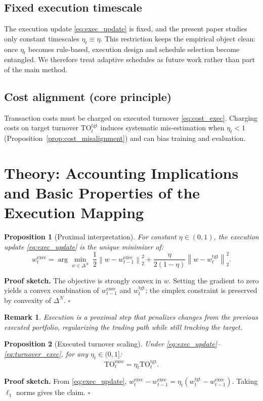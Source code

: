 \documentclass[10pt,twocolumn]{article}
\newtheorem{proposition}{Proposition}
\newtheorem{remark}{Remark}
\newcommand{\wexec}{w^{\mathrm{exec}}}
\newcommand{\wtgt}{w^{\mathrm{tgt}}}
\newcommand{\TOexec}{\mathrm{TO}^{\mathrm{exec}}}
\newcommand{\TOtgt}{\mathrm{TO}^{\mathrm{tgt}}}
\newcommand{\normtwo}[1]{\left\lVert #1 \right\rVert_2}
\newcommand{\DeltaN}{\Delta^N}
\begin{document}
\subsection{Fixed execution timescale}
The execution update \eqref{eq:exec_update} is fixed, and the present paper studies only constant timescales $\eta_t\equiv\eta$. This restriction keeps the empirical object clean: once $\eta_t$ becomes rule-based, execution design and schedule selection become entangled. We therefore treat adaptive schedules as future work rather than part of the main method.

\subsection{Cost alignment (core principle)}
Transaction costs must be charged on executed turnover \eqref{eq:cost_exec}. Charging costs on target turnover $\TOtgt_t$ induces systematic mis-estimation when $\eta_t<1$ (Proposition~\ref{prop:cost_misalignment}) and can bias training and evaluation.

\section{Theory: Accounting Implications and Basic Properties of the Execution Mapping}
\label{sec:theory}

\begin{proposition}[Proximal interpretation]\label{prop:prox}
For constant $\eta\in(0,1)$, the execution update \eqref{eq:exec_update} is the unique minimizer of:
\[
\wexec_t=\arg\min_{w \in \DeltaN}\;
\frac{1}{2}\normtwo{w-\wexec_{t-1}}^2 + \frac{\eta}{2(1-\eta)}\normtwo{w-\wtgt_t}^2.
\]
\end{proposition}
\noindent\textbf{Proof sketch.} The objective is strongly convex in $w$. Setting the gradient to zero yields a convex combination of $\wexec_{t-1}$ and $\wtgt_t$; the simplex constraint is preserved by convexity of $\DeltaN$. \hfill$\square$
\begin{remark}
Execution is a proximal step that penalizes \emph{changes from the previous executed portfolio}, regularizing the trading path while still tracking the target.
\end{remark}

\begin{proposition}[Executed turnover scaling]\label{prop:turnover_scaling}
Under \eqref{eq:exec_update}--\eqref{eq:turnover_exec}, for any $\eta_t\in(0,1]$:
\[
\TOexec_t = \eta_t \TOtgt_t.
\]
\end{proposition}
\noindent\textbf{Proof sketch.} From \eqref{eq:exec_update},
$\wexec_t-\wexec_{t-1}=\eta_t(\wtgt_t-\wexec_{t-1})$.
Taking $\ell_1$ norms gives the claim. \hfill$\square$
\end{document}
